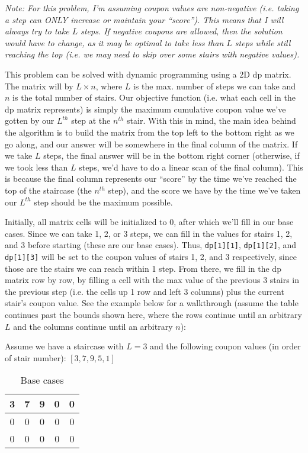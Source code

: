 \documentclass[12pt]{article}
\begin{document}
\begin{enumerate}
    \textit{Note: For this problem, I'm assuming coupon values are non-negative (i.e. taking a step can ONLY 
    increase or maintain your ``score''). This means that I will always try to take $L$ steps. If negative coupons are 
    allowed, then the solution would have to change, as it may be optimal to take less than $L$ steps while 
    still reaching the top (i.e. we may need to skip over some stairs with negative values).}

    This problem can be solved with dynamic programming using a 2D dp matrix. The matrix will by $L \times n$, where $L$ 
    is the max. number of steps we can take and $n$ is the total number of stairs. Our objective function (i.e. what 
    each cell in the dp matrix represents) is simply the maximum cumulative coupon value we've gotten by our $L^{th}$ 
    step at the $n^{th}$ stair. With this in mind, the main idea behind the algorithm is to build the matrix from 
    the top left to the bottom right as we go along, and our answer will be somewhere in the final column of the matrix. 
    If we take $L$ steps, the final answer will be in the bottom right corner (otherwise, if we took less than $L$ steps, 
    we'd have to do a linear scan of the final column). This is because the final column represents our ``score'' by the 
    time we've reached the top of the staircase (the $n^{th}$ step), and the score we have by the time we've taken our 
    $L^{th}$ step should be the maximum possible.

    Initially, all matrix cells will be initialized to 0, after which we'll fill in our base cases. Since we can take 1, 2, or 
    3 steps, we can fill in the values for stairs 1, 2, and 3 before starting (these are our base cases). Thus, 
    \texttt{dp[1][1]}, \texttt{dp[1][2]}, and \texttt{dp[1][3]} will be set to the coupon values of stairs 1, 2, and 3 
    respectively, since those are the stairs we can reach within 1 step. From there, we fill in the dp matrix row by row, 
    by filling a cell with the max value of the previous 3 stairs in the previous step (i.e. the cells up 1 row and 
    left 3 columns) plus the current stair's coupon value. See the example below for a walkthrough (assume the table 
    continues past the bounds shown here, where the rows continue until an arbitrary $L$ and the columns continue until 
    an arbitrary $n$):

    Assume we have a staircase with $L = 3$ and the following coupon values (in order of stair number): $[3, 7, 9, 5, 1]$

    \begin{table}[H]
        \centering
        \begin{tabular}{|c|c|c|c|c|} \hline
            3 & 7 & 9 & 0 & 0 \\ \hline
            0 & 0 & 0 & 0 & 0 \\ \hline
            0 & 0 & 0 & 0 & 0 \\ \hline
        \end{tabular}
        \caption{Base cases}
    \end{table}


\end{enumerate}
\end{document}
